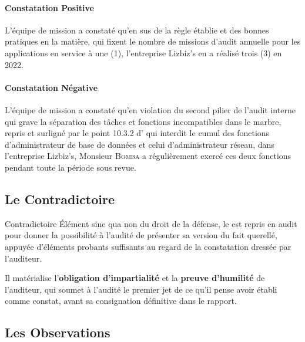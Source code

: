 \paragraph{Constatation Positive}
L'équipe de mission a constaté qu'en sus de la règle établie et des bonnes pratiques
en la matière, qui fixent le nombre de missions d'audit annuelle pour les applications
en service à une (1), l'entreprise Lizbiz's en a réalisé trois (3) en 2022.

\paragraph{Constatation Négative}
L'équipe de mission a constaté qu'en violation du second pilier de l'audit interne qui
grave la séparation des tâches et fonctions incompatibles dans le marbre, repris et
surligné par le point 10.3.2 d' qui interdit le cumul des fonctions
d'administrateur de base de données et celui d'administrateur réseau, dans l'entreprise
Lizbiz's, Monsieur \textsc{Bomba} a régulièrement exercé ces deux fonctions pendant
toute la période sous revue.

\subsection{Le Contradictoire}

\begin{boxdef}{Contradictoire}
Élément \og sine qua non \fg{} du droit de la défense, le 
est repris en audit pour donner la possibilité à l'audité de présenter sa version du
fait querellé, appuyée d'éléments probants suffisants au regard de la constatation
dressée par l'auditeur.

Il matérialise l'\textbf{obligation d'impartialité} et la \textbf{preuve d'humilité}
de l'auditeur, qui soumet à l'audité le premier jet de ce qu'il pense avoir établi comme
constat, avant sa consignation définitive dans le rapport.
\end{boxdef}

\subsection{Les Observations}

